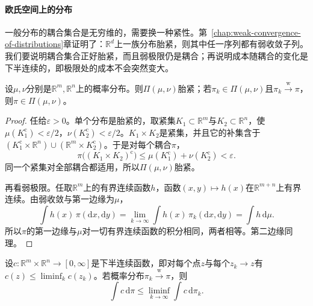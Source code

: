 \paragraph{欧氏空间上的分布}
一般分布的耦合集合是无穷维的，需要换一种紧性。第~\ref{chap:weak-convergence-of-distributions}章证明了：$\mathbb{R}^{d}$上一族分布胎紧，则其中任一序列都有弱收敛子列。我们要说明耦合集合正好胎紧，而且弱极限仍是耦合；再说明成本随耦合的变化是下半连续的，即极限处的成本不会突然变大。

\begin{lemma}[耦合集合的紧性]
\label{lem:ot-coupling-compact}
设$\mu,\nu$分别是$\mathbb{R}^{m},\mathbb{R}^{n}$上的概率分布。则$\Pi(\mu,\nu)$胎紧；若$\pi_k\in\Pi(\mu,\nu)$且$\pi_k\xrightarrow{\mathrm{w}}\pi$，则$\pi\in\Pi(\mu,\nu)$。
\end{lemma}

\begin{proof}
任给$\varepsilon>0$。单个分布是胎紧的，取紧集$K_1\subset\mathbb{R}^{m}$与$K_2\subset\mathbb{R}^{n}$，使$\mu(K_1^{\mathrm{c}})<\varepsilon/2$，$\nu(K_2^{\mathrm{c}})<\varepsilon/2$。$K_1\times K_2$是紧集，并且它的补集含于$(K_1^{\mathrm{c}}\times\mathbb{R}^{n})\cup(\mathbb{R}^{m}\times K_2^{\mathrm{c}})$。于是对每个耦合$\pi$，
\[
 \pi\bigl((K_1\times K_2)^{\mathrm{c}}\bigr)\leq\mu(K_1^{\mathrm{c}})+\nu(K_2^{\mathrm{c}})<\varepsilon .
\]
同一个紧集对全部耦合都适用，所以$\Pi(\mu,\nu)$胎紧。

再看弱极限。任取$\mathbb{R}^{m}$上的有界连续函数$h$，函数$(x,y)\mapsto h(x)$在$\mathbb{R}^{m+n}$上有界连续。由弱收敛与第一边缘为$\mu$，
\[
 \int h(x)\,\pi(\mathrm{d}x,\mathrm{d}y)=\lim_{k\to\infty}\int h(x)\,\pi_k(\mathrm{d}x,\mathrm{d}y)=\int h\,\mathrm{d}\mu .
\]
所以$\pi$的第一边缘与$\mu$对一切有界连续函数的积分相同，两者相等。第二边缘同理。
\end{proof}

\begin{lemma}[成本的下半连续性]
\label{lem:ot-cost-lsc}
设$c:\mathbb{R}^{m}\times\mathbb{R}^{n}\to[0,\infty]$是下半连续函数，即对每个点$z$与每个$z_k\to z$有$c(z)\leq\liminf_kc(z_k)$。若概率分布$\pi_k\xrightarrow{\mathrm{w}}\pi$，则
\begin{equation}
 \int c\,\mathrm{d}\pi\leq\liminf_{k\to\infty}\int c\,\mathrm{d}\pi_k .
 \label{eq:ot-cost-lsc}
\end{equation}
\end{lemma}

